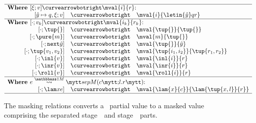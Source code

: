 
\begin{figure}
\begin{abstrsyn}
\[\begin{array}{rrrl}
\hline
\multicolumn{4}{l}  {\text{\bf Where } [\xi;v] \vsplito \mval {i} {r} \text{:}}          \\
\hspace{0.25in} 
&[\hat y \mapsto q,\xi;v]  &\vsplito& \mval  {i}             {\letin {\hat y} q {r}}      \\
\hline
\multicolumn{4}{l}  {\text{\bf Where } [\cdot;v_k] \vsplito \mval {i_k} {r_k} \text{:}}  \\
&[\cdot;\tup{}]            &\vsplito& \mval  {\tup{}}        {\tup{}}                     \\
&[\cdot;\pure{m}]          &\vsplito& \mval  {m}             {\tup{}}                     \\
&[\cdot;\next{\hat y}]     &\vsplito& \mval  {\tup{}}            {\hat y}                     \\
&[\cdot;\tup{v_1,v_2}]         &\vsplito& \mval  {\tup{i_1,i_2}}     {\tup{r_1,r_2}}                  \\
&[\cdot;\inl{v}]           &\vsplito& \mval  {\inl{i}}       {r}                          \\
&[\cdot;\inr{v}]           &\vsplito& \mval  {\inr{i}}       {r}                          \\
&[\cdot;\roll{v}]          &\vsplito& \mval  {\roll{i}}      {r}                          \\
\hline
\multicolumn{4}{l}  {\text{\bf Where } \splitone e A {c}{l.r} \text{:}}                   \\
&[\cdot;\lam xe]           &\vsplito& \mval  {\lam {x} {c}}  {\lam {\tup{x,l}} {r}}			\\
\hline
\end{array}\]
\end{abstrsyn}
\caption{The masking relations converts a \lang\ partial value to a masked value
comprising the separated stage~\bbone\ and stage~\bbtwo\ parts.}
\label{fig:valMask}
\end{figure}
